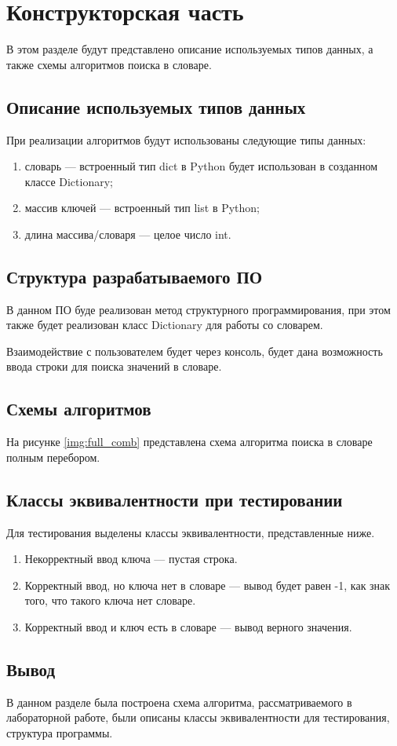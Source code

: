 
\chapter{Конструкторская часть}
В этом разделе будут представлено описание используемых типов данных,
а также схемы алгоритмов поиска в словаре.

\section{Описание используемых типов данных}
При реализации алгоритмов будут использованы следующие типы данных:
\begin{enumerate}[label=\arabic*)]
	\item словарь --- встроенный тип dict \cite{pythondict} в Python\cite{pythonlang} будет использован в созданном классе Dictionary;
	\item массив ключей --- встроенный тип list \cite{pythonlist} в Python\cite{pythonlang};
	\item длина массива/словаря --- целое число int.
\end{enumerate}

\section{Структура разрабатываемого ПО}
В данном ПО буде реализован метод структурного программирования, при этом также будет реализован класс Dictionary для работы со словарем.

Взаимодействие с пользователем будет через консоль, будет дана возможность ввода строки для поиска значений в словаре.

\section{Схемы алгоритмов}
На рисунке \ref{img:full_comb} представлена схема алгоритма поиска в словаре полным перебором.

\clearpage


\section{Классы эквивалентности при тестировании}
Для тестирования выделены классы эквивалентности, представленные ниже.
\begin{enumerate}
	\item Некорректный ввод ключа --- пустая строка.
	\item Корректный ввод, но ключа нет в словаре --- вывод будет равен -1, как знак того, что такого ключа нет словаре.
	\item Корректный ввод и ключ есть в словаре --- вывод верного значения.
\end{enumerate}

\section{Вывод}
В данном разделе была построена схема алгоритма, рассматриваемого в лабораторной работе, были описаны классы эквивалентности для тестирования, структура программы.